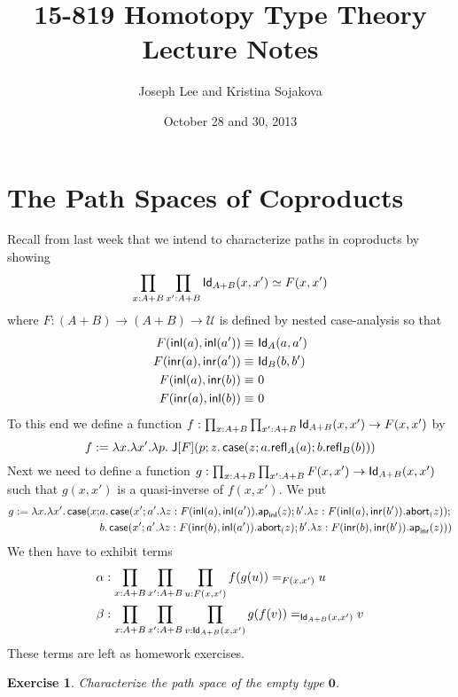 \documentclass[12pt]{article}
\newcommand{\ap}{\mathsf{ap}}
\newtheorem*{exercise}{Exercise}
\begin{document}
\title{15-819 Homotopy Type Theory Lecture Notes}
\author{Joseph Lee and Kristina Sojakova}
\date{October 28 and 30, 2013}

\maketitle

\section{The Path Spaces of Coproducts}\label{}

Recall from last week that we intend to characterize paths in coproducts by showing
\[ \prod_{x:A+B}\prod_{x':A+B} \mathsf{Id}_{A+B}(x,x') \simeq F(x,x') \]
where $F: (A+B) \to (A+B) \to \mathcal{U}$ is defined by nested case-analysis so that
\begin{align*}
 F({\mathsf{inl}}(a),{\mathsf{inl}}(a'))\equiv &\ \mathsf{Id}_{A}(a,a') \\
 F({\mathsf{inr}}(a),{\mathsf{inr}}(a'))\equiv &\ \mathsf{Id}_{B}(b,b') \\
 F({\mathsf{inl}}(a),{\mathsf{inr}}(b)) \equiv &\ 0 \\
 F({\mathsf{inr}}(a),{\mathsf{inl}}(b)) \equiv &\ 0
\end{align*}
To this end we define a function $f : \prod_{x:A+B}\prod_{x':A+B} \mathsf{Id}_{A+B}(x,x') \to F(x,x')$ by
\[
f := \lambda x.\lambda x'.\lambda p.\; \mathsf{J}[F](p;z.\operatorname{\textsf{case}}(z;a.\mathsf{refl}_{A}(a);b.\mathsf{refl}_{B}(b)))
\]
Next we need to define a function $g:\prod_{x:A+B}\prod_{x':A+B} F(x,x')\to\mathsf{Id}_{A+B}(x,x')$ such that $g(x,x')$ is a quasi-inverse of $f(x,x')$.
We put
{\small
\begin{align*}
g := \lambda x.\lambda x'.\case(x;&a.\case(x';a'.\lambda z:F(\inl(a),\inl(a')).\ap_{\inl}(z);b'.\lambda z:F(\inl(a),\inr(b')).\abort(z));\\
                                  &b.\case(x';a'.\lambda z:F(\inr(b),\inl(a')).\abort(z);b'.\lambda z:F(\inr(b),\inr(b')).\ap_{\inr}(z)))
\end{align*}}
We then have to exhibit terms
\begin{align*}
\alpha&:\prod_{x:A+B}\prod_{x':A+B}\prod_{u:F(x,x')}f(g(u)) =_{F(x,x')} u\\
\beta&:\prod_{x:A+B}\prod_{x':A+B}\prod_{v:\mathsf{Id}_{A+B}(x,x')}g(f(v)) =_{\mathsf{Id}_{A+B}(x,x')} v
\end{align*}
These terms are left as homework exercises.

\begin{exercise}
Characterize the path space of the empty type $\mathbf{0}$.
\end{exercise}
\end{document}
